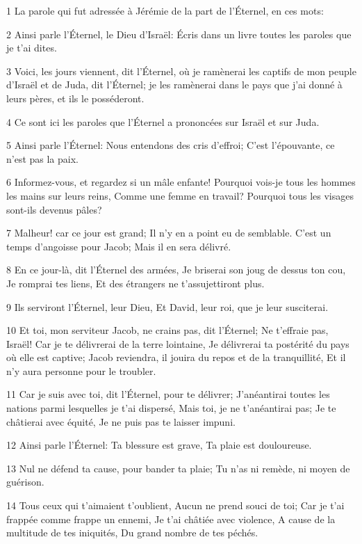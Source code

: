 \par 1 La parole qui fut adressée à Jérémie de la part de l'Éternel, en ces mots:
\par 2 Ainsi parle l'Éternel, le Dieu d'Israël: Écris dans un livre toutes les paroles que je t'ai dites.
\par 3 Voici, les jours viennent, dit l'Éternel, où je ramènerai les captifs de mon peuple d'Israël et de Juda, dit l'Éternel; je les ramènerai dans le pays que j'ai donné à leurs pères, et ils le posséderont.
\par 4 Ce sont ici les paroles que l'Éternel a prononcées sur Israël et sur Juda.
\par 5 Ainsi parle l'Éternel: Nous entendons des cris d'effroi; C'est l'épouvante, ce n'est pas la paix.
\par 6 Informez-vous, et regardez si un mâle enfante! Pourquoi vois-je tous les hommes les mains sur leurs reins, Comme une femme en travail? Pourquoi tous les visages sont-ils devenus pâles?
\par 7 Malheur! car ce jour est grand; Il n'y en a point eu de semblable. C'est un temps d'angoisse pour Jacob; Mais il en sera délivré.
\par 8 En ce jour-là, dit l'Éternel des armées, Je briserai son joug de dessus ton cou, Je romprai tes liens, Et des étrangers ne t'assujettiront plus.
\par 9 Ils serviront l'Éternel, leur Dieu, Et David, leur roi, que je leur susciterai.
\par 10 Et toi, mon serviteur Jacob, ne crains pas, dit l'Éternel; Ne t'effraie pas, Israël! Car je te délivrerai de la terre lointaine, Je délivrerai ta postérité du pays où elle est captive; Jacob reviendra, il jouira du repos et de la tranquillité, Et il n'y aura personne pour le troubler.
\par 11 Car je suis avec toi, dit l'Éternel, pour te délivrer; J'anéantirai toutes les nations parmi lesquelles je t'ai dispersé, Mais toi, je ne t'anéantirai pas; Je te châtierai avec équité, Je ne puis pas te laisser impuni.
\par 12 Ainsi parle l'Éternel: Ta blessure est grave, Ta plaie est douloureuse.
\par 13 Nul ne défend ta cause, pour bander ta plaie; Tu n'as ni remède, ni moyen de guérison.
\par 14 Tous ceux qui t'aimaient t'oublient, Aucun ne prend souci de toi; Car je t'ai frappée comme frappe un ennemi, Je t'ai châtiée avec violence, A cause de la multitude de tes iniquités, Du grand nombre de tes péchés.
